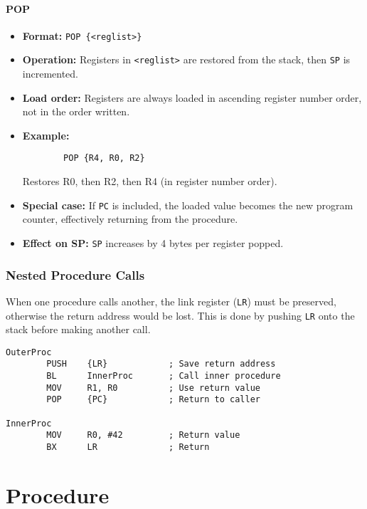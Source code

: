 \paragraph{POP}
\begin{itemize}[nosep]
    \item \textbf{Format:} \texttt{POP \{<reglist>\}}
    \item \textbf{Operation:} Registers in \texttt{<reglist>} are restored from the stack, then \texttt{SP} is incremented.
    \item \textbf{Load order:} Registers are always loaded in ascending register number order, not in the order written.
    \item \textbf{Example:}
\begin{lstlisting}
        POP {R4, R0, R2}
\end{lstlisting}
          Restores R0, then R2, then R4 (in register number order).
    \item \textbf{Special case:} If \texttt{PC} is included, the loaded value becomes the new program counter, effectively returning from the procedure.
    \item \textbf{Effect on SP:} \texttt{SP} increases by 4 bytes per register popped.
\end{itemize}


\subsubsection{Nested Procedure Calls}

When one procedure calls another, the link register (\texttt{LR}) must be preserved, otherwise the return address would be lost. This is done by pushing \texttt{LR} onto the stack before making another call.

\begin{lstlisting}[caption={Nested procedure example}]
OuterProc
        PUSH    {LR}            ; Save return address
        BL      InnerProc       ; Call inner procedure
        MOV     R1, R0          ; Use return value
        POP     {PC}            ; Return to caller

InnerProc 
        MOV     R0, #42         ; Return value
        BX      LR              ; Return
\end{lstlisting}

\newpage
\section{Procedure}

